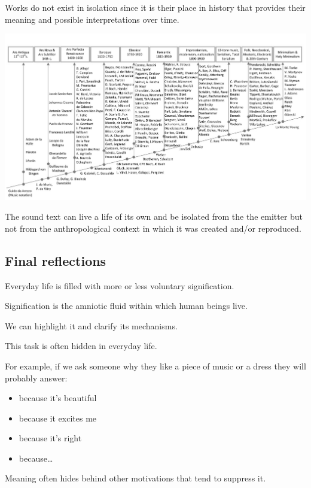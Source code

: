Works do not exist in isolation since it is their place in history that provides their meaning and possible interpretations over time.

\begin{center}
\includegraphics[scale=1.1]{../img/lineatempo.png}
\end{center}

The sound text can live a life of its own and be isolated from the the emitter but not from the anthropological context in which it was created and/or reproduced.

\subsection{Final reflections}\label{final-reflections}

Everyday life is filled with more or less voluntary signification.

Signification is the amniotic fluid within which human beings live.

We can highlight it and clarify its mechanisms.

This task is often hidden in everyday life.

For example, if we ask someone why they like a piece of music or a dress they will probably answer:

\begin{itemize}
\tightlist
\item because it's beautiful
\item because it excites me
\item because it's right
\item because\ldots{}
\end{itemize}

Meaning often hides behind other motivations that tend to suppress it.

